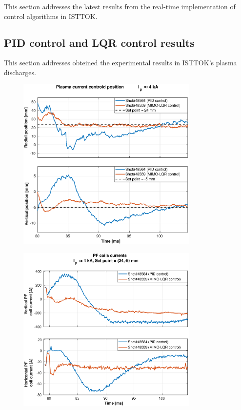 This section addresses the latest results from the real-time implementation of control algorithms in ISTTOK. 

\subsection{PID control and LQR control results}

This section addresses obteined the experimental results in ISTTOK's plasma discharges.

\begin{figure}
	\centering
	\includegraphics[width=0.8\textwidth]{Chp5/PIDvsMIMO_564_559_2.eps}
	\label{564_559}
\end{figure}

\begin{figure}
	\centering
	\includegraphics[width=0.8\textwidth]{Chp5/PIDvsMIMO_564_559_curr_2.eps}
	\label{564_559curr}
\end{figure}


